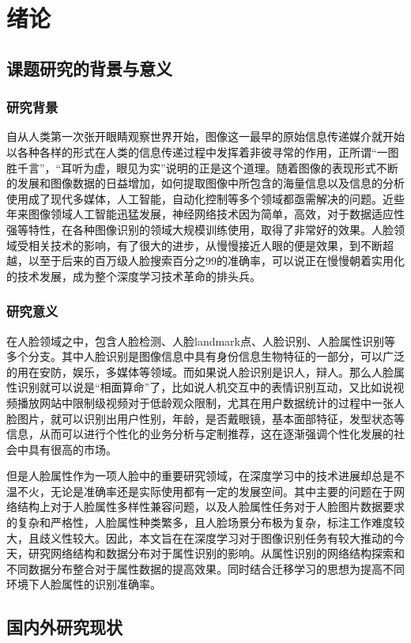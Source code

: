 \chapter{绪论}
\section{课题研究的背景与意义}
\subsection{研究背景}
自从人类第一次张开眼睛观察世界开始，图像这一最早的原始信息传递媒介就开始以各种各样的形式在人类的信息传递过程中发挥着非彼寻常的作用，正所谓“一图胜千言”，“耳听为虚，眼见为实”说明的正是这个道理。随着图像的表现形式不断的发展和图像数据的日益增加，如何提取图像中所包含的海量信息以及信息的分析使用成了现代多媒体，人工智能，自动化控制等多个领域都亟需解决的问题。近些年来图像领域人工智能迅猛发展，神经网络技术因为简单，高效，对于数据适应性强等特性，在各种图像识别的领域大规模训练使用，取得了非常好的效果。人脸领域受相关技术的影响，有了很大的进步，从慢慢接近人眼的便是效果，到不断超越，以至于后来的百万级人脸搜索百分之99的准确率，可以说正在慢慢朝着实用化的技术发展，成为整个深度学习技术革命的排头兵。
\subsection{研究意义}
在人脸领域之中，包含人脸检测、人脸landmark点、人脸识别、人脸属性识别等多个分支。其中人脸识别是图像信息中具有身份信息生物特征的一部分，可以广泛的用在安防，娱乐，多媒体等领域。而如果说人脸识别是识人，辩人。那么人脸属性识别就可以说是“相面算命”了，比如说人机交互中的表情识别互动，又比如说视频播放网站中限制级视频对于低龄观众限制，尤其在用户数据统计的过程中一张人脸图片，就可以识别出用户性别，年龄，是否戴眼镜，基本面部特征，发型状态等信息，从而可以进行个性化的业务分析与定制推荐，这在逐渐强调个性化发展的社会中具有很高的市场。

但是人脸属性作为一项人脸中的重要研究领域，在深度学习中的技术进展却总是不温不火，无论是准确率还是实际使用都有一定的发展空间。其中主要的问题在于网络结构上对于人脸属性多样性兼容问题，以及人脸属性任务对于人脸图片数据要求的复杂和严格性，人脸属性种类繁多，且人脸场景分布极为复杂，标注工作难度较大，且歧义性较大。因此，本文旨在在深度学习对于图像识别任务有较大推动的今天，研究网络结构和数据分布对于属性识别的影响。从属性识别的网络结构探索和不同数据分布整合对于属性数据的提高效果。同时结合迁移学习的思想为提高不同环境下人脸属性的识别准确率。
\section{国内外研究现状}
